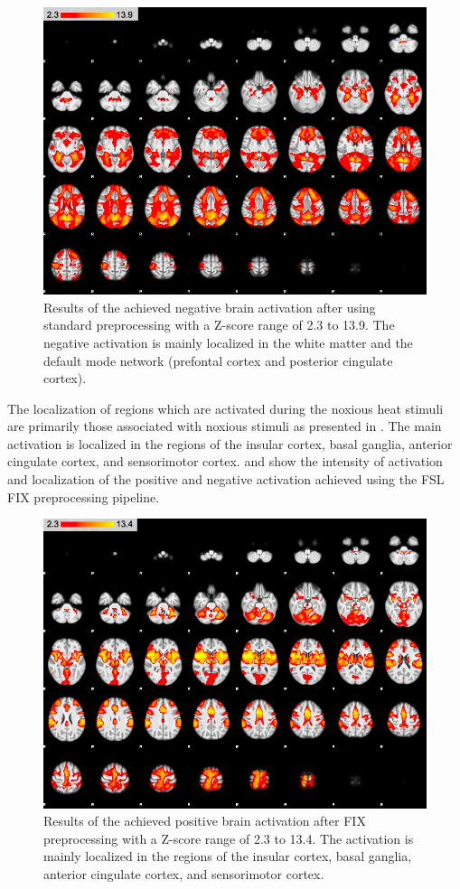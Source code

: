 \begin{figure}[H]                 
	\includegraphics[width=.65\textwidth]{figures/Results/STD_neg}  
	\caption{Results of the achieved negative brain activation after using standard preprocessing with a Z-score range of 2.3 to 13.9. The negative activation is mainly localized in the white matter and the default mode network (prefontal cortex and posterior cingulate cortex).}
	\label{fig:res:stdneg} 
\end{figure}

The localization of regions which are activated during the noxious heat stimuli are primarily those associated with noxious stimuli as presented in . The main activation is localized in the regions of the insular cortex, basal ganglia, anterior cingulate cortex, and sensorimotor cortex. %
 and  show the intensity of activation and localization of the positive and  negative activation achieved using the FSL FIX preprocessing pipeline. 

\begin{figure}[H]                 
	\includegraphics[width=.65\textwidth]{figures/Results/FIX_pos}  
	\caption{Results of the achieved positive brain activation after FIX preprocessing with a Z-score range of 2.3 to 13.4. The activation is mainly localized in the regions of the insular cortex, basal ganglia, anterior cingulate cortex, and sensorimotor cortex.}
	\label{fig:res:FIXpos} 
\end{figure}

